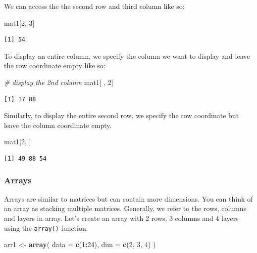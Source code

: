 \documentclass[]{article}
\newenvironment{Shaded}{\begin{snugshade}}{\end{snugshade}}
\newcommand{\CommentTok}[1]{\textcolor[rgb]{0.56,0.35,0.01}{\textit{#1}}}
\newcommand{\DataTypeTok}[1]{\textcolor[rgb]{0.13,0.29,0.53}{#1}}
\newcommand{\DecValTok}[1]{\textcolor[rgb]{0.00,0.00,0.81}{#1}}
\newcommand{\KeywordTok}[1]{\textcolor[rgb]{0.13,0.29,0.53}{\textbf{#1}}}
\newcommand{\NormalTok}[1]{#1}
\newcommand{\OperatorTok}[1]{\textcolor[rgb]{0.81,0.36,0.00}{\textbf{#1}}}
\newcommand{\StringTok}[1]{\textcolor[rgb]{0.31,0.60,0.02}{#1}}
\begin{document}
We can access the the second row and third column like so:

\begin{Shaded}
\begin{Highlighting}[]
\NormalTok{mat1[}\DecValTok{2}\NormalTok{, }\DecValTok{3}\NormalTok{]}
\end{Highlighting}
\end{Shaded}

\begin{verbatim}
[1] 54
\end{verbatim}

To display an entire column, we specify the column we want to display and leave the row coordinate empty like so:

\begin{Shaded}
\begin{Highlighting}[]
\CommentTok{# display the 2nd column}
\NormalTok{mat1[ , }\DecValTok{2}\NormalTok{]}
\end{Highlighting}
\end{Shaded}

\begin{verbatim}
[1] 17 88
\end{verbatim}

Similarly, to display the entire second row, we specify the row coordinate but leave the column coordinate empty.

\begin{Shaded}
\begin{Highlighting}[]
\NormalTok{mat1[}\DecValTok{2}\NormalTok{, ]}
\end{Highlighting}
\end{Shaded}

\begin{verbatim}
[1] 49 88 54
\end{verbatim}

\hypertarget{arrays}{%
\subsubsection{Arrays}\label{arrays}}

Arrays are similar to matrices but can contain more dimensions. You can think of an array as stacking multiple matrices. Generally, we refer to the rows, columns and layers in array. Let's create an array with 2 rows, 3 columns and 4 layers using the \texttt{array()} function.

\begin{Shaded}
\begin{Highlighting}[]
\NormalTok{arr1 <-}\StringTok{ }\KeywordTok{array}\NormalTok{(}
  \DataTypeTok{data =} \KeywordTok{c}\NormalTok{(}\DecValTok{1}\OperatorTok{:}\DecValTok{24}\NormalTok{),}
  \DataTypeTok{dim =} \KeywordTok{c}\NormalTok{(}\DecValTok{2}\NormalTok{, }\DecValTok{3}\NormalTok{, }\DecValTok{4}\NormalTok{)}
\NormalTok{)}
\end{Highlighting}
\end{Shaded}
\end{document}
